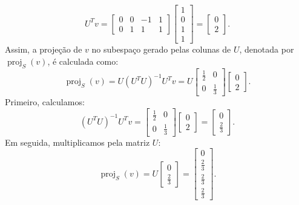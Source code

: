 \begin{resolution}
\begin{enumerate}[label=\alph*)]
          \[
            U^T v = \begin{bmatrix}
              0 & 0 & -1 & 1 \\
              0 & 1 & 1  & 1
            \end{bmatrix}
            \begin{bmatrix}
              1 \\ 0 \\ 1 \\ 1
            \end{bmatrix}
            = \begin{bmatrix}
              0 \\ 2
            \end{bmatrix}.
          \]
          Assim, a projeção de \( v \) no subespaço gerado pelas colunas de \( U \), denotada por \( \operatorname{proj}_S(v) \), é calculada como:
          \[
            \operatorname{proj}_S(v) = U (U^T U)^{-1} U^T v = U \begin{bmatrix}
              \frac{1}{2} & 0           \\
              0           & \frac{1}{3}
            \end{bmatrix} \begin{bmatrix}
              0 \\ 2
            \end{bmatrix}.
          \]
          Primeiro, calculamos:
          \[
            (U^T U)^{-1} U^T v = \begin{bmatrix}
              \frac{1}{2} & 0           \\
              0           & \frac{1}{3}
            \end{bmatrix}
            \begin{bmatrix}
              0 \\ 2
            \end{bmatrix}
            = \begin{bmatrix}
              0 \\ \frac{2}{3}
            \end{bmatrix}.
          \]
          Em seguida, multiplicamos pela matriz \( U \):
          \[
            \operatorname{proj}_S(v) = U \begin{bmatrix}
              0 \\ \frac{2}{3}
            \end{bmatrix}
            = \begin{bmatrix}
              0 \\ \frac{2}{3} \\[8pt] \frac{2}{3} \\[8pt] \frac{2}{3}
            \end{bmatrix}.
          \]


\end{enumerate}
\end{resolution}
